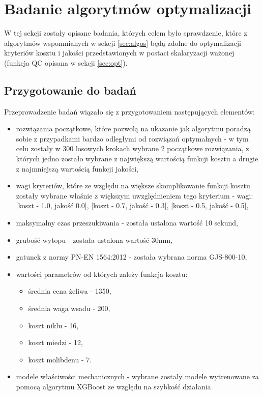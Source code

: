 \section{Badanie algorytmów optymalizacji}\label{sec:opt-research}
W tej sekcji zostały opisane badania, których celem było sprawdzenie, które z algorytmów wspomnianych w sekcji \ref{sec:algos} będą zdolne do optymalizacji kryteriów kosztu i jakości przedstawionych w postaci skalaryzacji ważonej (funkcja QC opisana w sekcji \ref{sec:opt}).

\subsection{Przygotowanie do badań}
Przeprowadzenie badań wiązało się z przygotowaniem następujących elementów:
\begin{itemize}
    \item rozwiązania początkowe, które pozwolą na ukazanie jak algorytmu poradzą sobie z przypadkami bardzo odległymi od rozwiązań optymalnych - w tym celu zostały w 300 losowych krokach wybrane 2 początkowe rozwiązania, z których jedno zostało wybrane z największą wartością funkcji kosztu a drugie z najmniejszą wartością funkcji jakości,
    \item wagi kryteriów, które ze względu na większe skomplikowanie funkcji kosztu zostały wybrane właśnie z większym uwzględnieniem tego kryterium - wagi: [koszt - 1.0, jakość 0.0], [koszt - 0.7, jakość - 0.3], [koszt - 0.5, jakość - 0.5],
    \item maksymalny czas przeszukiwania - została ustalona wartość 10 sekund,
    \item grubość wytopu - została ustalona wartość 30mm,
    \item gatunek z normy PN-EN 1564:2012 - została wybrana norma GJS-800-10,
    \item wartości parametrów od których zależy funkcja kosztu:
    \begin{itemize}
        \item średnia cena żeliwa - 1350,
        \item średnia waga wsadu - 200,
        \item koszt niklu - 16,
        \item koszt miedzi - 12,
        \item koszt molibdenu - 7.
    \end{itemize}
    \item modele właściwości mechanicznych - wybrane zostały modele wytrenowane za pomocą algorytmu XGBoost ze względu na szybkość działania.
\end{itemize}

